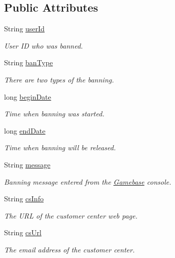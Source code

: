 \subsection*{Public Attributes}
\begin{DoxyCompactItemize}
\item 
String \hyperlink{classcom_1_1toast_1_1android_1_1gamebase_1_1auth_1_1data_1_1_ban_info_ae9d0b602f581392f4e9a08d579632b94}{user\+Id}
\begin{DoxyCompactList}\small\item\em User ID who was banned. \end{DoxyCompactList}\item 
String \hyperlink{classcom_1_1toast_1_1android_1_1gamebase_1_1auth_1_1data_1_1_ban_info_ace990e7178e0986d721cac30736f8b3a}{ban\+Type}
\begin{DoxyCompactList}\small\item\em There are two types of the banning. \end{DoxyCompactList}\item 
long \hyperlink{classcom_1_1toast_1_1android_1_1gamebase_1_1auth_1_1data_1_1_ban_info_a8b827b673c840e560a92055f0c8c480f}{begin\+Date}
\begin{DoxyCompactList}\small\item\em Time when banning was started. \end{DoxyCompactList}\item 
long \hyperlink{classcom_1_1toast_1_1android_1_1gamebase_1_1auth_1_1data_1_1_ban_info_a5d05de439b5392f41d2e3673442f9785}{end\+Date}
\begin{DoxyCompactList}\small\item\em Time when banning will be released. \end{DoxyCompactList}\item 
String \hyperlink{classcom_1_1toast_1_1android_1_1gamebase_1_1auth_1_1data_1_1_ban_info_a2836db0f8ae4563c70935b5e514bdc21}{message}
\begin{DoxyCompactList}\small\item\em Banning message entered from the \hyperlink{classcom_1_1toast_1_1android_1_1gamebase_1_1_gamebase}{Gamebase} console. \end{DoxyCompactList}\item 
String \hyperlink{classcom_1_1toast_1_1android_1_1gamebase_1_1auth_1_1data_1_1_ban_info_a35d86c2d4d0199e57471a7e2b2ad5934}{cs\+Info}
\begin{DoxyCompactList}\small\item\em The U\+RL of the customer center web page. \end{DoxyCompactList}\item 
String \hyperlink{classcom_1_1toast_1_1android_1_1gamebase_1_1auth_1_1data_1_1_ban_info_a06b0f551e49da9f93b731c28a6597062}{cs\+Url}
\begin{DoxyCompactList}\small\item\em The email address of the customer center. \end{DoxyCompactList}\end{DoxyCompactItemize}


